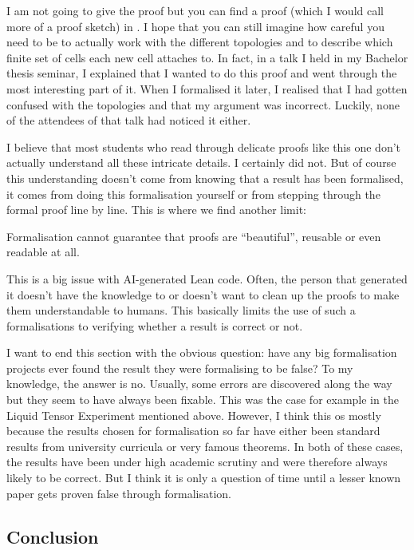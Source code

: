 I am not going to give the proof but you can find a proof (which I would call more of a proof sketch) in \cite{Hatcher}. I hope that you can still imagine how careful you need to be to actually work with the different topologies and to describe which finite set of cells each new cell attaches to. In fact, in a talk I held in my Bachelor thesis seminar, I explained that I wanted to do this proof and went through the most interesting part of it. When I formalised it later, I realised that I had gotten confused with the topologies and that my argument was incorrect. Luckily, none of the attendees of that talk had noticed it either.

I believe that most students who read through delicate proofs like this one don't actually understand all these intricate details. I certainly did not. But of course this understanding doesn't come from knowing that a result has been formalised, it comes from doing this formalisation yourself or from stepping through the formal proof line by line. This is where we find another limit: 

\begin{limit}
Formalisation cannot guarantee that proofs are ``beautiful'', reusable or even readable at all. 
\end{limit}

This is a big issue with AI-generated Lean code. Often, the person that generated it doesn't have the knowledge to or doesn't want to clean up the proofs to make them understandable to humans. This basically limits the use of such a formalisations to verifying whether a result is correct or not. 

I want to end this section with the obvious question: have any big formalisation projects ever found the result they were formalising to be false? To my knowledge, the answer is no. Usually, some errors are discovered along the way but they seem to have always been fixable. This was the case for example in the Liquid Tensor Experiment mentioned above. However, I think this os mostly because the results chosen for formalisation so far have either been standard results from university curricula or very famous theorems. In both of these cases, the results have been under high academic scrutiny and were therefore always likely to be correct. But I think it is only a question of time until a lesser known paper gets proven false through formalisation. 

\subsection*{Conclusion}

